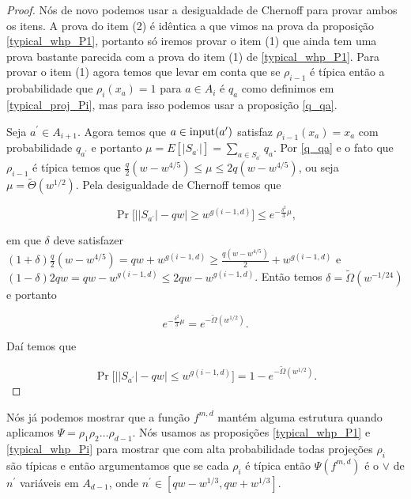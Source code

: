 \begin{proof}

Nós de novo podemos usar a desigualdade de Chernoff para provar ambos os itens. A prova do item (2) é idêntica a que vimos na prova da proposição \ref{typical_whp_P1}, portanto só iremos provar o item (1) que ainda tem uma prova bastante parecida com a prova do item (1) de \ref{typical_whp_P1}. Para provar o item (1) agora temos que levar em conta que se $\rho_{i - 1}$ é típica então a probabilidade que $\rho_{i}(x_{a}) = 1$ para $a \in A_{i}$ é $q_{a}$ como definimos em \ref{typical_proj_Pi}, mas para isso podemos usar a proposição \ref{q_qa}. 
	
Seja $a^{\prime} \in A_{i + 1}$. Agora temos que $a \in \text{input}(a^{\prime})$ satisfaz $\rho_{i - 1}(x_{a}) = x_{a}$ com probabilidade $q_{a^{\prime}}$ e portanto $\mu = E[\lvert S_{a^{\prime}} \rvert] = \sum_{a \in S_{a^{\prime}}} q_{a}$. Por \ref{q_qa} e o fato que $\rho_{i - 1}$ é típica temos que $\frac{q}{2}(w - w^{4/5}) \leq \mu \leq 2q(w - w^{4/5})$, ou seja $\mu = \widetilde{\Theta}(w^{1/2})$. Pela desigualdade de Chernoff temos que
	
\begin{equation*}
	\Pr\big[ \big\lvert \lvert S_{a^{\prime}} \rvert - qw \big\rvert \geq w^{g(i - 1, d)} \big] \leq e^{-\frac{\delta^{2}}{3}\mu},
\end{equation*}
	
em que $\delta$ deve satisfazer $(1 + \delta)\frac{q}{2}(w - w^{4/5}) = qw + w^{g(i - 1, d)} \geq \frac{q(w - w^{4/5})}{2} + w^{g(i - 1, d)}$ e $(1 - \delta)2qw = qw - w^{g(i - 1, d)} \leq 2qw - w^{g(i -1, d)}$. Então temos $\delta = \widetilde{\Omega}(w^{-1/24})$ e portanto

\begin{equation*}
	e^{-\frac{\delta^{2}}{3}\mu} = e^{-\widetilde{\Omega}(w^{1/2})}.
\end{equation*}

Daí temos que

\begin{equation*}
	\Pr \big[ \big\lvert \lvert S_{a^{\prime}} \rvert - qw \big\rvert \leq w^{g(i - 1, d)} \big] = 1 - e^{-\widetilde{\Omega}(w^{1/2})}.
\end{equation*}

\end{proof}

Nós já podemos mostrar que a função $f^{m, d}$ mantém alguma estrutura quando aplicamos $\Psi = \rho_{1}\rho_{2}\dots\rho_{d - 1}$. Nós usamos as proposições \ref{typical_whp_P1} e \ref{typical_whp_Pi} para mostrar que com alta probabilidade todas projeções $\rho_{i}$ são típicas e então argumentamos que se cada $\rho_{i}$ é típica então $\Psi(f^{m, d})$ é o $\lor$ de $n^{\prime}$ variáveis em $A_{d - 1}$, onde $n^{\prime} \in [qw - w^{1/3}, qw + w^{1/3}]$.

